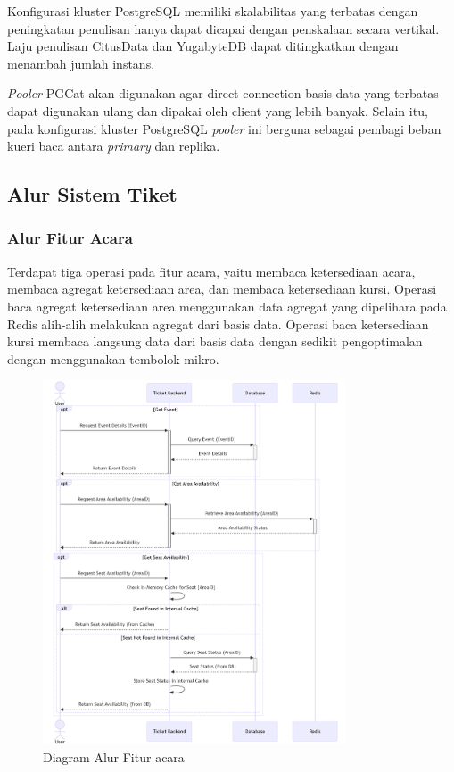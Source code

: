 Konfigurasi kluster PostgreSQL memiliki skalabilitas yang terbatas dengan peningkatan penulisan hanya dapat dicapai dengan penskalaan secara vertikal. Laju penulisan CitusData dan YugabyteDB dapat ditingkatkan dengan menambah jumlah instans.

\textit{Pooler} PGCat akan digunakan agar direct connection basis data yang terbatas dapat digunakan ulang dan dipakai oleh client yang lebih banyak. Selain itu, pada konfigurasi kluster PostgreSQL \textit{pooler} ini berguna sebagai pembagi beban kueri baca antara \textit{primary} dan replika.

\subsection{Alur Sistem Tiket}

\subsubsection{Alur Fitur Acara}

Terdapat tiga operasi pada fitur acara, yaitu membaca ketersediaan acara, membaca agregat ketersediaan area, dan membaca ketersediaan kursi. Operasi baca agregat ketersediaan area menggunakan data agregat yang dipelihara pada Redis alih-alih melakukan agregat dari basis data. Operasi baca ketersediaan kursi membaca langsung data dari basis data dengan sedikit pengoptimalan dengan menggunakan tembolok mikro.

\begin{figure}[h]
    \centering
    \includegraphics[width=0.8\textwidth]{resources/chapter-3/event-flow.png}
    \caption{Diagram Alur Fitur acara}
    \label{fig:flow-event}
\end{figure}

